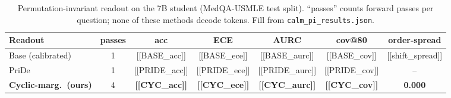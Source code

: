\begin{table}[tb]
\caption{Permutation-invariant readout on the 7B student (MedQA-USMLE test split).
``passes'' counts forward passes per question; none of these methods decode tokens.
Fill from \texttt{calm\_pi\_results.json}.}
\label{tab:pi}
\centering
\small
\setlength{\tabcolsep}{4pt}
\begin{tabular}{@{}lcccccc@{}}
\toprule
Readout & passes & acc & ECE & AURC & cov@80 & order-spread \\
\midrule
Base (calibrated)        & 1 & [[BASE_acc]]  & [[BASE_ece]]  & [[BASE_aurc]]  & [[BASE_cov]]  & [[shift_spread]] \\
PriDe \cite{pride}       & 1 & [[PRIDE_acc]] & [[PRIDE_ece]] & [[PRIDE_aurc]] & [[PRIDE_cov]] & -- \\
\textbf{Cyclic-marg.\ (ours)} & 4 & \textbf{[[CYC_acc]]} & \textbf{[[CYC_ece]]} & \textbf{[[CYC_aurc]]} & \textbf{[[CYC_cov]]} & \textbf{0.000} \\
\bottomrule
\end{tabular}
\end{table}



